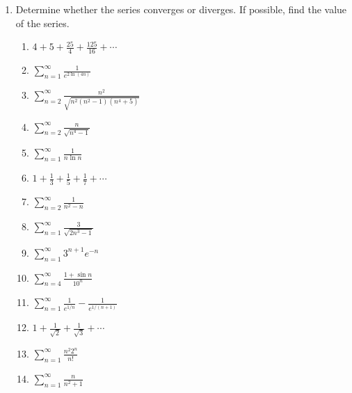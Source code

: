 \documentclass[letterpaper]{article}
\begin{document}
\begin{enumerate}

\item Determine whether the series converges or diverges. If possible, find the value of the series.
	\begin{enumerate}

	\item $4+5+ \frac{25}4+\frac{125}{16}+\cdots$

	\item $\sum_{n=1}^\infty \frac1{e^{2\ln(4n)}}$

	\item $\sum_{n=2}^\infty \frac{n^2}{\sqrt{n^2(n^2-1)(n^4+5)}}$

	\item $\sum_{n=2}^\infty \frac{n}{\sqrt{n^4-1}}$

	\item $\sum_{n=1}^\infty \frac1{n\ln n}$

	\item $1+\frac13+\frac15+\frac17+\cdots$

	\item $\sum_{n=2}^\infty \frac{1}{n^2-n}$

	\item $\sum_{n=1}^\infty \frac{3}{\sqrt{2n^3-1}}$

	\item $\sum_{n=1}^\infty 3^{n+1}{e^{-n}}$

	\item $\sum_{n=4}^\infty \frac{1+\sin n}{10^n}$

	\item $\sum_{n=1}^\infty \frac1{e^{1/n}}-\frac 1{e^{1/(n+1)}}$

	\item $1+\frac1{\sqrt{2}}+\frac1{\sqrt{3}}+\cdots$

	\item $\sum_{n=1}^\infty \frac{n^2 2^n}{n!}$

	\item $\sum_{n=1}^\infty \frac n {n^2+1}$


\end{enumerate}
\end{enumerate}
\end{document}
